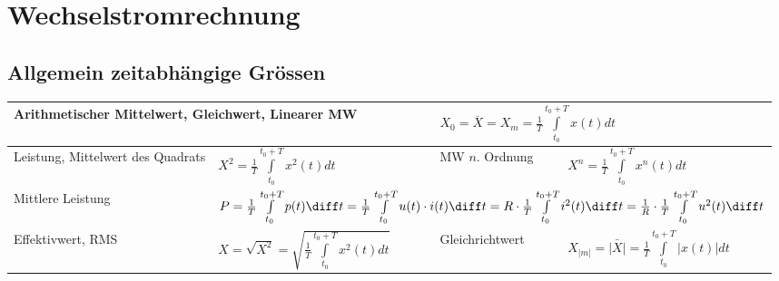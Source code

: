\section{Wechselstromrechnung}
	\subsection{Allgemein zeitabhängige Grössen}
	\begin{tabular}{|ll|ll|}
    \hline
	\multicolumn{2}{|l}{Arithmetischer Mittelwert, Gleichwert, Linearer MW} 
	    	& \multicolumn{2}{l|}{$X_0 = \overline{X} = X_m = \frac {1} {T} \int\limits_{t_0}^{t_0+T}
	    	x(t)dt$} \\
	\hline
	Leistung, Mittelwert des Quadrats
		& $X^2 = \frac {1} {T} \int\limits_{t_0}^{t_0+T} x^2(t)dt$ 
		& MW $n$. Ordnung
		& $X^n = \frac {1} {T} \int\limits_{t_0}^{t_0+T} x^n(t)dt$ \\
	\hline
	Mittlere Leistung
			& \multicolumn{3}{l|}{$P= \frac{1}{T}\int\limits_{t_0}^{t_0+T} p(t) \diff t = \frac{1}{T}\int\limits_{t_0}^{t_0+T} u(t) \cdot i(t) \diff t = 
			R\cdot \frac{1}{T}\int\limits_{t_0}^{t_0+T} i^2(t) \diff t =
			\frac{1}{R} \cdot \frac{1}{T}\int\limits_{t_0}^{t_0+T} u^2(t) \diff t
			$}\\
		\hline
	Effektivwert, RMS 
		& $X = \sqrt{X^2} = \sqrt{\frac{1}{T} \int\limits ^{t_0+T}_{t_0}{x^2(t)dt}}$
		& Gleichrichtwert 
		& $X_{|m|} = \bar{|X|} = \frac{1}{T} \int\limits_{t_0}^{t_0+T}{|x(t)| dt}$ \\
	\hline
   	\end{tabular}
   	
